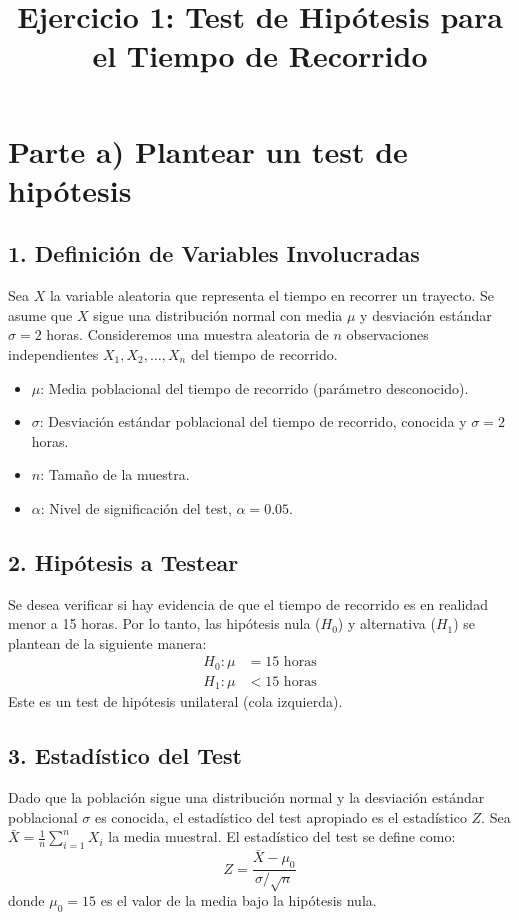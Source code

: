 \documentclass{article}
\title{Ejercicio 1: Test de Hipótesis para el Tiempo de Recorrido}
\author{}
\date{}
\begin{document}
\maketitle

\section*{Parte a) Plantear un test de hipótesis}

\subsection*{1. Definición de Variables Involucradas}
Sea $X$ la variable aleatoria que representa el tiempo en recorrer un trayecto. Se asume que $X$ sigue una distribución normal con media $\mu$ y desviación estándar $\sigma = 2$ horas.
Consideremos una muestra aleatoria de $n$ observaciones independientes $X_1, X_2, \dots, X_n$ del tiempo de recorrido.
\begin{itemize}
    \item $\mu$: Media poblacional del tiempo de recorrido (parámetro desconocido).
    \item $\sigma$: Desviación estándar poblacional del tiempo de recorrido, conocida y $\sigma = 2$ horas.
    \item $n$: Tamaño de la muestra.
    \item $\alpha$: Nivel de significación del test, $\alpha = 0.05$.
\end{itemize}

\subsection*{2. Hipótesis a Testear}
Se desea verificar si hay evidencia de que el tiempo de recorrido es en realidad menor a 15 horas. Por lo tanto, las hipótesis nula ($H_0$) y alternativa ($H_1$) se plantean de la siguiente manera:
\begin{align*} H_0: \mu &= 15 \text{ horas} \\ H_1: \mu &< 15 \text{ horas} \end{align*}
Este es un test de hipótesis unilateral (cola izquierda).

\subsection*{3. Estadístico del Test}
Dado que la población sigue una distribución normal y la desviación estándar poblacional $\sigma$ es conocida, el estadístico del test apropiado es el estadístico $Z$.
Sea $\bar{X} = \frac{1}{n}\sum_{i=1}^n X_i$ la media muestral. El estadístico del test se define como:
$$ Z = \frac{\bar{X} - \mu_0}{\sigma/\sqrt{n}} $$
donde $\mu_0 = 15$ es el valor de la media bajo la hipótesis nula.
\end{document}
